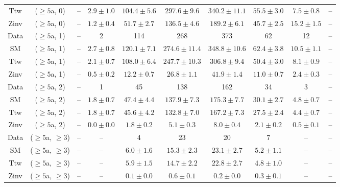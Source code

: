 \begin{table}[h!]
{\begin{tabular}{cccccccccc}
	Ttw & ($\ge5$a, 0) & -- & $2.9\pm 1.0$ & $104.4\pm 5.6$ & $297.6\pm 9.6$ & $340.2\pm 11.1$ & $55.5\pm 3.0$ & $7.5\pm 0.8$ & -- \\[0.5ex] 
	Zinv & ($\ge5$a, 0) & -- & $1.2\pm 0.4$ & $51.7\pm 2.7$ & $136.5\pm 4.6$ & $189.2\pm 6.1$ & $45.7\pm 2.5$ & $15.2\pm 1.5$ & -- \\[0.5ex] 
	Data & ($\ge5$a, 1) & -- & 2 & 114 & 268 & 373 & 62 & 12 & -- \\[0.5ex] 
	SM & ($\ge5$a, 1) & -- & $2.7\pm 0.8$ & $120.1\pm 7.1$ & $274.6\pm 11.4$ & $348.8\pm 10.6$ & $62.4\pm 3.8$ & $10.5\pm 1.1$ & -- \\[0.5ex] 
	Ttw & ($\ge5$a, 1) & -- & $2.1\pm 0.7$ & $108.0\pm 6.4$ & $247.7\pm 10.3$ & $306.8\pm 9.4$ & $50.4\pm 3.0$ & $8.1\pm 0.9$ & -- \\[0.5ex] 
	Zinv & ($\ge5$a, 1) & -- & $0.5\pm 0.2$ & $12.2\pm 0.7$ & $26.8\pm 1.1$ & $41.9\pm 1.4$ & $11.0\pm 0.7$ & $2.4\pm 0.3$ & -- \\[0.5ex] 
	Data & ($\ge5$a, 2) & -- & 1 & 45 & 138 & 162 & 34 & 3 & -- \\[0.5ex] 
	SM & ($\ge5$a, 2) & -- & $1.8\pm 0.7$ & $47.4\pm 4.4$ & $137.9\pm 7.3$ & $175.3\pm 7.7$ & $30.1\pm 2.7$ & $4.8\pm 0.7$ & -- \\[0.5ex] 
	Ttw & ($\ge5$a, 2) & -- & $1.8\pm 0.7$ & $45.6\pm 4.2$ & $132.8\pm 7.0$ & $167.2\pm 7.3$ & $27.5\pm 2.4$ & $4.4\pm 0.7$ & -- \\[0.5ex] 
	Zinv & ($\ge5$a, 2) & -- & $0.0\pm 0.0$ & $1.8\pm 0.2$ & $5.1\pm 0.3$ & $8.0\pm 0.4$ & $2.1\pm 0.2$ & $0.5\pm 0.1$ & -- \\[0.5ex] 
	Data & ($\ge5$a, $\ge3$) & -- & -- & 4 & 23 & 20 & 7 & -- & -- \\[0.5ex] 
	SM & ($\ge5$a, $\ge3$) & -- & -- & $6.0\pm 1.6$ & $15.3\pm 2.3$ & $23.1\pm 2.7$ & $5.2\pm 1.1$ & -- & -- \\[0.5ex] 
	Ttw & ($\ge5$a, $\ge3$) & -- & -- & $5.9\pm 1.5$ & $14.7\pm 2.2$ & $22.8\pm 2.7$ & $4.8\pm 1.0$ & -- & -- \\[0.5ex] 
	Zinv & ($\ge5$a, $\ge3$) & -- & -- & $0.1\pm 0.0$ & $0.6\pm 0.1$ & $0.2\pm 0.0$ & $0.3\pm 0.1$ & -- & -- \\[0.5ex] 
	\hline
	\hline
\end{tabular}}
\end{table}

